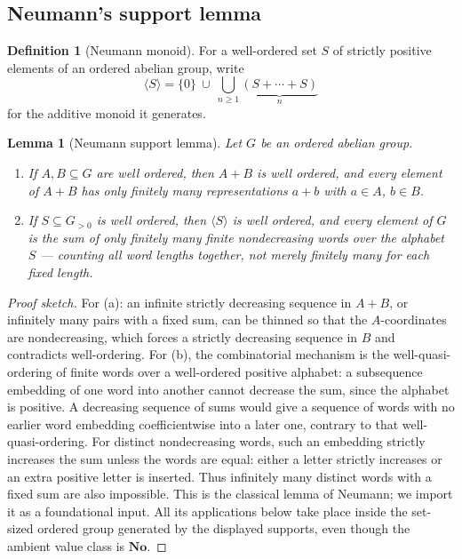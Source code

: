 \documentclass[11pt,a4paper]{article}
\numberwithin{equation}{section}
\newtheorem{lemma}[theorem]{Lemma}
\theoremstyle{definition}
\newtheorem{definition}[theorem]{Definition}
\theoremstyle{remark}
\theoremstyle{plain}
\newcommand{\No}{\mathbf{No}}
\newcommand{\Neu}[1]{\langle #1\rangle}
\begin{document}
\subsection{Neumann's support lemma}\label{a:sec:neumann}

\begin{definition}[Neumann monoid]\label{a:def:neumannmonoid}
For a well-ordered set $S$ of strictly positive elements of an ordered
abelian group, write
\[
 \Neu S=\{0\}\ \cup\ \bigcup_{n\ge1}\underbrace{(S+\cdots+S)}_{n}
\]
for the additive monoid it generates.
\end{definition}

\begin{lemma}[Neumann support lemma]\label{a:lem:neumann}
Let $G$ be an ordered abelian group.
\begin{enumerate}[label=\textup{(\alph*)},leftmargin=2.2em]
\item If $A,B\subseteq G$ are well ordered, then $A+B$ is well ordered,
and every element of $A+B$ has only finitely many representations
$a+b$ with $a\in A$, $b\in B$.
\item If $S\subseteq G_{>0}$ is well ordered, then $\Neu S$ is well
ordered, and every element of $G$ is the sum of only finitely many
finite nondecreasing words over the alphabet $S$ --- \emph{counting all
word lengths together}, not merely finitely many for each fixed length.
\end{enumerate}
\end{lemma}

\begin{proof}[Proof sketch]
For (a): an infinite strictly decreasing sequence in $A+B$, or
infinitely many pairs with a fixed sum, can be thinned so that the
$A$-coordinates are nondecreasing, which forces a strictly decreasing
sequence in $B$ and contradicts well-ordering.  For (b), the
combinatorial mechanism is the well-quasi-ordering of finite words over
a well-ordered positive alphabet: a subsequence embedding of one word
into another cannot decrease the sum, since the alphabet is positive.
A decreasing sequence of sums would give a sequence of words with
no earlier word embedding coefficientwise into a later one, contrary
to that well-quasi-ordering. For distinct nondecreasing words, such an
embedding strictly increases the sum unless the words are equal:
either a letter strictly increases or an extra positive letter is
inserted. Thus infinitely many distinct words with a fixed sum are
also impossible.  This is the classical lemma of Neumann; we import it as
a foundational input.  All its applications below take place inside the
set-sized ordered group generated by the displayed supports, even though
the ambient value class is $\No$.
\end{proof}
\end{document}
